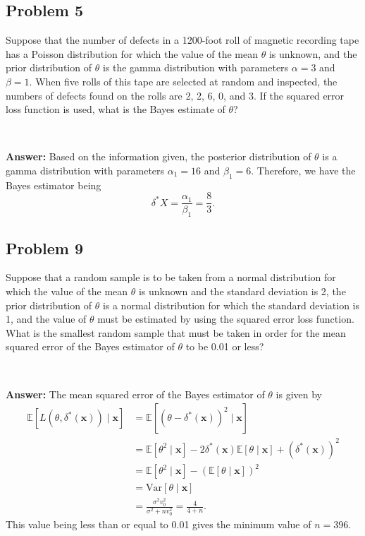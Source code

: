 \documentclass{article}
\begin{document}
\bigskip

\subsection*{Problem 5}
Suppose that the number of defects in a 1200-foot roll of magnetic recording tape has a Poisson distribution for which the value of the mean $\theta$ is unknown, and the prior distribution of $\theta$ is the gamma distribution with parameters $\alpha = 3$ and $\beta = 1$. When five rolls of this tape are selected at random and inspected, the numbers of defects found on the rolls are 2, 2, 6, 0, and 3. If the squared error loss function is used, what is the Bayes estimate of $\theta$?

\

\textbf{Answer:} Based on the information given, the posterior distribution of $\theta$ is a gamma distribution with parameters $\alpha_1 = 16$ and $\beta_1 = 6$. Therefore, we have the Bayes estimator being
\begin{equation*}
\delta^*{X} = \frac{\alpha_1}{\beta_1} = \frac{8}{3}.
\end{equation*}


\subsection*{Problem 9}
Suppose that a random sample is to be taken from a normal distribution for which the value of the mean $\theta$ is unknown and the standard deviation is 2, the prior distribution of $\theta$ is a normal distribution for which the standard deviation is 1, and the value of $\theta$ must be estimated by using the squared error loss function. What is the smallest random sample that must be taken in order for the mean squared error of the Bayes estimator of $\theta$ to be 0.01 or less?

\

\textbf{Answer:} The mean squared error of the Bayes estimator of $\theta$ is given by
\begin{align*}
\mathbb{E}[L(\theta, \delta^*(\boldsymbol{x})) \mid \boldsymbol{x}] &= \mathbb{E}[(\theta - \delta^*(\boldsymbol{x}))^2 \mid \boldsymbol{x}] \\
&= \mathbb{E}[\theta^2 \mid \boldsymbol{x}] - 2 \delta^*(\boldsymbol{x}) \mathbb{E}[\theta \mid \boldsymbol{x}] + (\delta^*(\boldsymbol{x}))^2 \\
&= \mathbb{E}[\theta^2 \mid \boldsymbol{x}] - (\mathbb{E}[\theta \mid \boldsymbol{x}])^2 \\
&= \text{Var}[\theta \mid \boldsymbol{x}] \\
&= \frac{\sigma^2 v_0^2}{\sigma^2 + n v_0^2} = \frac{4}{4 + n}.
\end{align*}
This value being less than or equal to 0.01 gives the minimum value of $n = 396$.

\newpage
\end{document}

